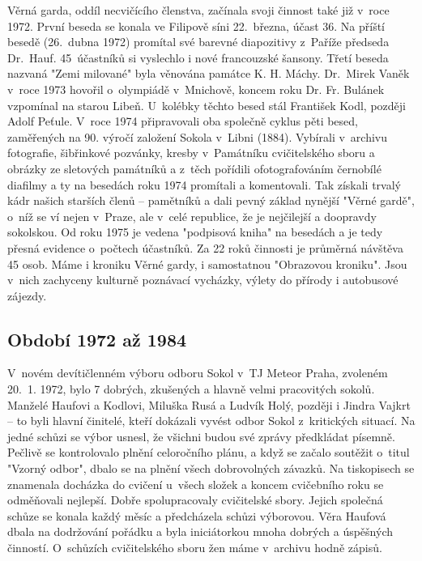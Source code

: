 \documentclass[a5paper, 11pt, twoside]{article}
\begin{document}
Věrná garda, oddíl necvičícího členstva, začínala svoji činnost také již
v~roce 1972. První beseda se konala ve Filipově síni 22.~března, účast
36. Na příští besedě (26.~dubna 1972) promítal své barevné diapozitivy
z~Paříže předseda Dr.~Hauf. 45~účastníků si vyslechlo i nové francouzské
šansony. Třetí beseda nazvaná "Zemi milované" byla věnována památce K.
H. Máchy. Dr.~Mirek Vaněk v~roce 1973 hovořil o~olympiádě v~Mnichově,
koncem roku Dr. Fr. Bulánek vzpomínal na starou Libeň. U~kolébky těchto
besed stál František Kodl, později Adolf Peťule. V~roce 1974
připravovali oba společně cyklus pěti besed, zaměřených na 90. výročí
založení Sokola v~Libni (1884). Vybírali v~archivu fotografie,
šibřinkové pozvánky, kresby v~Památníku cvičitelského sboru a obrázky ze
sletových památníků a z~těch pořídili ofotografováním černobílé diafilmy
a ty na besedách roku 1974 promítali a komentovali. Tak získali trvalý
kádr našich starších členů -- pamětníků a dali pevný základ nynější
"Věrné gardě", o~níž se ví nejen v~Praze, ale v~celé republice, že je
nejčilejší a doopravdy sokolskou. Od roku 1975 je vedena "podpisová
kniha" na besedách a je tedy přesná evidence o~počtech účastníků. Za 22
roků činnosti je průměrná návštěva 45 osob. Máme i kroniku Věrné gardy,
i samostatnou "Obrazovou kroniku". Jsou v~nich zachyceny kulturně
poznávací vycházky, výlety do přírody i autobusové zájezdy.

\subsection{Období 1972 až 1984}

V~novém devítičlenném výboru odboru Sokol v~TJ Meteor Praha, zvoleném
20.~1. 1972, bylo 7 dobrých, zkušených a hlavně velmi pracovitých
sokolů. Manželé Haufovi a Kodlovi, Miluška Rusá a Ludvík Holý, později i
Jindra Vajkrt -- to byli hlavní činitelé, kteří dokázali vyvést odbor
Sokol z~kritických situací. Na jedné schůzi se výbor usnesl, že všichni
budou své zprávy předkládat písemně. Pečlivě se kontrolovalo plnění
celoročního plánu, a když se začalo soutěžit o~titul "Vzorný odbor",
dbalo se na plnění všech dobrovolných závazků. Na tiskopisech se
znamenala docházka do cvičení u~všech složek a koncem cvičebního roku se
odměňovali nejlepší. Dobře spolupracovaly cvičitelské sbory. Jejich
společná schůze se konala každý měsíc a předcházela schůzi výborovou.
Věra Haufová dbala na dodržování pořádku a byla iniciátorkou mnoha
dobrých a úspěšných činností. O~schůzích cvičitelského sboru žen máme
v~archivu hodně zápisů.
\end{document}
